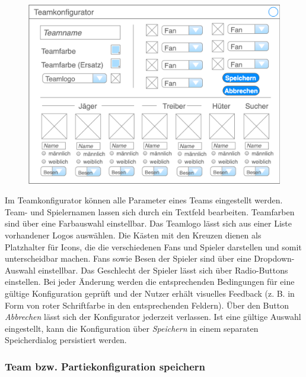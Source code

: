     \begin{figure}[H]
        \centering
        \includegraphics[width=\textwidth]{../Meilenstein03/images/teamkonfigurator}
    \end{figure}

    Im Teamkonfigurator können alle Parameter eines Teams eingestellt werden. Team- und Spielernamen lassen sich durch ein Textfeld bearbeiten. Teamfarben sind über eine Farbauswahl einstellbar. Das Teamlogo lässt sich aus einer Liste vorhandener Logos auswählen. Die Kästen mit den Kreuzen dienen als Platzhalter für Icons, die die verschiedenen Fans und Spieler darstellen und somit unterscheidbar machen. Fans sowie Besen der Spieler sind über eine Dropdown-Auswahl einstellbar. Das Geschlecht der Spieler lässt sich über Radio-Buttons einstellen. Bei jeder Änderung werden die entsprechenden Bedingungen für eine gültige Konfiguration geprüft und der Nutzer erhält visuelles Feedback (z. B. in Form von roter Schriftfarbe in den entsprechenden Feldern). Über den Button \textit{Abbrechen} lässt sich der Konfigurator jederzeit verlassen. Ist eine gültige Auswahl eingestellt, kann die Konfiguration über \textit{Speichern} in einem separaten Speicherdialog persistiert werden.

    \subsubsection{Team bzw. Partiekonfiguration speichern}

